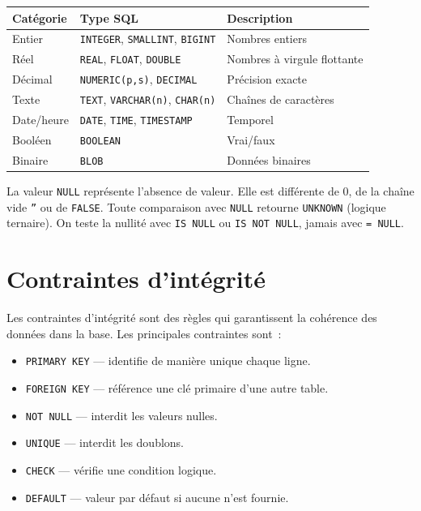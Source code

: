 \begin{formules}[title=\textbf{Types de donn\'ees courants}]
\begin{center}
\begin{tabular}{lll}
\toprule
\textbf{Cat\'egorie} & \textbf{Type SQL} & \textbf{Description} \\
\midrule
Entier & \texttt{INTEGER}, \texttt{SMALLINT}, \texttt{BIGINT} & Nombres entiers \\
R\'eel & \texttt{REAL}, \texttt{FLOAT}, \texttt{DOUBLE} & Nombres \`a virgule flottante \\
D\'ecimal & \texttt{NUMERIC(p,s)}, \texttt{DECIMAL} & Pr\'ecision exacte \\
Texte & \texttt{TEXT}, \texttt{VARCHAR(n)}, \texttt{CHAR(n)} & Cha\^ines de caract\`eres \\
Date/heure & \texttt{DATE}, \texttt{TIME}, \texttt{TIMESTAMP} & Temporel \\
Bool\'een & \texttt{BOOLEAN} & Vrai/faux \\
Binaire & \texttt{BLOB} & Donn\'ees binaires \\
\bottomrule
\end{tabular}
\end{center}
\end{formules}

\begin{attention}[title=\textbf{NULL n'est pas z\'ero}]
La valeur \texttt{NULL} repr\'esente l'absence de valeur. Elle est diff\'erente
de $0$, de la cha\^ine vide \texttt{''} ou de \texttt{FALSE}.
Toute comparaison avec \texttt{NULL} retourne \texttt{UNKNOWN} (logique ternaire).
On teste la nullit\'e avec \texttt{IS NULL} ou \texttt{IS NOT NULL}, jamais avec \texttt{= NULL}.
\end{attention}

\section{Contraintes d'int\'egrit\'e}

\begin{definition}
Les contraintes d'int\'egrit\'e sont des r\`egles qui garantissent la coh\'erence
des donn\'ees dans la base. Les principales contraintes sont~:
\begin{itemize}
    \item \texttt{PRIMARY KEY} --- identifie de mani\`ere unique chaque ligne.
    \item \texttt{FOREIGN KEY} --- r\'ef\'erence une cl\'e primaire d'une autre table.
    \item \texttt{NOT NULL} --- interdit les valeurs nulles.
    \item \texttt{UNIQUE} --- interdit les doublons.
    \item \texttt{CHECK} --- v\'erifie une condition logique.
    \item \texttt{DEFAULT} --- valeur par d\'efaut si aucune n'est fournie.
\end{itemize}
\end{definition}

